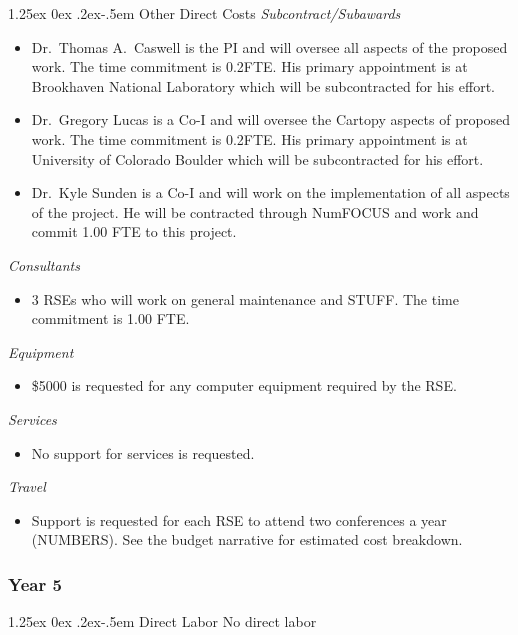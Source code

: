 \documentclass[12pt]{article}
\makeatletter
\numberwithin{page}{section}
\renewcommand{\paragraph}{%
  \@startsection{paragraph}{4}%
  {\z@}{1.25ex \@plus 0ex \@minus .2ex}{-.5em}%
  {\normalfont\normalsize\itshape\bfseries}%
}
\makeatother
\begin{document}
\paragraph{Other Direct Costs}
\textit{Subcontract/Subawards}
\begin{itemize}
  \item Dr.\ Thomas A.\ Caswell is the PI and will oversee all aspects of the
  proposed work.  The time commitment is 0.2FTE.  His primary
  appointment is at Brookhaven National Laboratory which will be
  subcontracted for his effort.
\item Dr.\ Gregory Lucas is a Co-I and will oversee the Cartopy aspects of
  proposed work.  The time commitment is 0.2FTE.  His primary appointment is at
  University of Colorado Boulder which will be subcontracted for his effort.
\item Dr.\ Kyle Sunden is a Co-I and will work on the implementation of all
  aspects of the project.  He will be contracted through NumFOCUS and work and
  commit 1.00 FTE to this project.
\end{itemize}
\textit{Consultants}
\begin{itemize}
\item 3 RSEs who will work on general maintenance and STUFF.  The time commitment is 1.00
  FTE.
\end{itemize}
\textit{Equipment}
\begin{itemize}
\item \$5000 is requested for any computer equipment required by the RSE.
\end{itemize}
\textit{Services}
\begin{itemize}
\item No support for services is requested.
\end{itemize}
\textit{Travel}
\begin{itemize}
\item Support is requested for each RSE to attend two conferences a
  year (NUMBERS).  See the budget narrative for estimated cost
  breakdown.
\end{itemize}
\subsubsection{Year 5}
\paragraph{Direct Labor}
No direct labor
\end{document}
